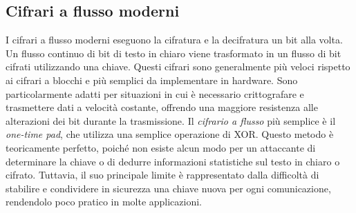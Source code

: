 \documentclass[12pt]{report}
\begin{document}
\subsection{Cifrari a flusso moderni}
I cifrari a flusso moderni eseguono la cifratura e la decifratura un bit alla volta. Un flusso continuo di bit di testo in chiaro viene trasformato in un flusso di bit cifrati utilizzando una chiave. Questi cifrari sono generalmente più veloci rispetto ai cifrari a blocchi e più semplici da implementare in hardware. Sono particolarmente adatti per situazioni in cui è necessario crittografare e trasmettere dati a velocità costante, offrendo una maggiore resistenza alle alterazioni dei bit durante la trasmissione. Il \emph{cifrario a flusso} più semplice è il \emph{one-time pad}, che utilizza una semplice operazione di XOR. Questo metodo è teoricamente perfetto, poiché non esiste alcun modo per un attaccante di determinare la chiave o di dedurre informazioni statistiche sul testo in chiaro o cifrato. Tuttavia, il suo principale limite è rappresentato dalla difficoltà di stabilire e condividere in sicurezza una chiave nuova per ogni comunicazione, rendendolo poco pratico in molte applicazioni.
\end{document}
